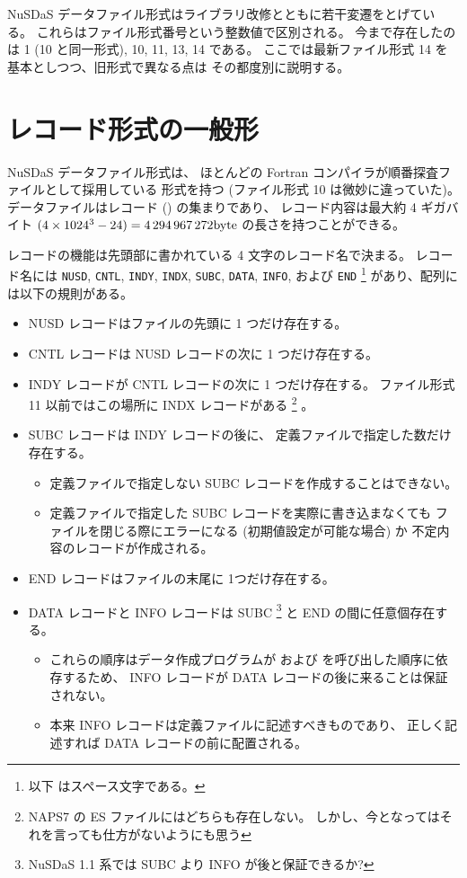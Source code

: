\label{sec:datafile}

NuSDaS データファイル形式はライブラリ改修とともに若干変遷をとげている。
これらはファイル形式番号という整数値で区別される。
今まで存在したのは 1 (10 と同一形式), 10, 11, 13, 14 である。
ここでは最新ファイル形式 14 を基本としつつ、旧形式で異なる点は
その都度別に説明する。

\section{レコード形式の一般形}
\label{sec:fmt.general}

NuSDaS データファイル形式は、
ほとんどの Fortran コンパイラが順番探査ファイルとして採用している
形式を持つ (ファイル形式 10 は微妙に違っていた)。
データファイルはレコード () の集まりであり、
レコード内容は最大約 4 ギガバイト
\((4 \times 1024^3 - 24) = {\rm 4\,294\,967\,272 byte}\)
の長さを持つことができる。

レコードの機能は先頭部に書かれている 4 文字のレコード名で決まる。
レコード名には
{\tt NUSD},
{\tt CNTL},
{\tt INDY},
{\tt INDX},
{\tt SUBC},
{\tt DATA},
{\tt INFO}, および
{\tt END\SPC}
\footnote{以下 {\tt \SPC} はスペース文字である。}
があり、配列には以下の規則がある。

\begin{itemize}
\item{} NUSD レコードはファイルの先頭に 1 つだけ存在する。
\item{} CNTL レコードは NUSD レコードの次に 1 つだけ存在する。
\item{} INDY レコードが CNTL レコードの次に 1 つだけ存在する。
	ファイル形式 11 以前ではこの場所に INDX レコードがある
	\footnote{NAPS7 の ES ファイルにはどちらも存在しない。
	しかし、今となってはそれを言っても仕方がないようにも思う}%
	。
\item{} SUBC レコードは INDY レコードの後に、
	定義ファイルで指定した数だけ存在する。
  \begin{itemize}
  \item 定義ファイルで指定しない SUBC レコードを作成することはできない。
  \item 定義ファイルで指定した SUBC レコードを実際に書き込まなくても
	ファイルを閉じる際にエラーになる (初期値設定が可能な場合) か
	不定内容のレコードが作成される。
  \end{itemize}
\item{} END レコードはファイルの末尾に 1つだけ存在する。 
\item{} DATA レコードと INFO レコードは SUBC%
	\footnote{NuSDaS 1.1 系では SUBC より INFO が後と保証できるか?}%
	と END の間に任意個存在する。
  \begin{itemize}
  \item これらの順序はデータ作成プログラムが
	 および
	 を呼び出した順序に依存するため、
	INFO レコードが DATA レコードの後に来ることは保証されない。
  \item 本来 INFO レコードは定義ファイルに記述すべきものであり、
  	正しく記述すれば DATA レコードの前に配置される。
  \end{itemize}
\end{itemize}

